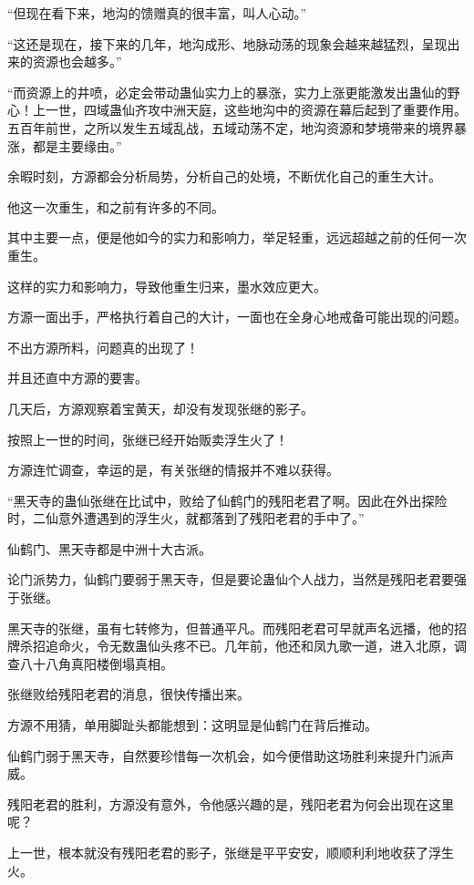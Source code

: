 \begin{this_body}
“但现在看下来，地沟的馈赠真的很丰富，叫人心动。”

“这还是现在，接下来的几年，地沟成形、地脉动荡的现象会越来越猛烈，呈现出来的资源也会越多。”

“而资源上的井喷，必定会带动蛊仙实力上的暴涨，实力上涨更能激发出蛊仙的野心！上一世，四域蛊仙齐攻中洲天庭，这些地沟中的资源在幕后起到了重要作用。五百年前世，之所以发生五域乱战，五域动荡不定，地沟资源和梦境带来的境界暴涨，都是主要缘由。”

余暇时刻，方源都会分析局势，分析自己的处境，不断优化自己的重生大计。

他这一次重生，和之前有许多的不同。

其中主要一点，便是他如今的实力和影响力，举足轻重，远远超越之前的任何一次重生。

这样的实力和影响力，导致他重生归来，墨水效应更大。

方源一面出手，严格执行着自己的大计，一面也在全身心地戒备可能出现的问题。

不出方源所料，问题真的出现了！

并且还直中方源的要害。

几天后，方源观察着宝黄天，却没有发现张继的影子。

按照上一世的时间，张继已经开始贩卖浮生火了！

方源连忙调查，幸运的是，有关张继的情报并不难以获得。

“黑天寺的蛊仙张继在比试中，败给了仙鹤门的残阳老君了啊。因此在外出探险时，二仙意外遭遇到的浮生火，就都落到了残阳老君的手中了。”

仙鹤门、黑天寺都是中洲十大古派。

论门派势力，仙鹤门要弱于黑天寺，但是要论蛊仙个人战力，当然是残阳老君要强于张继。

黑天寺的张继，虽有七转修为，但普通平凡。而残阳老君可早就声名远播，他的招牌杀招追命火，令无数蛊仙头疼不已。几年前，他还和凤九歌一道，进入北原，调查八十八角真阳楼倒塌真相。

张继败给残阳老君的消息，很快传播出来。

方源不用猜，单用脚趾头都能想到：这明显是仙鹤门在背后推动。

仙鹤门弱于黑天寺，自然要珍惜每一次机会，如今便借助这场胜利来提升门派声威。

残阳老君的胜利，方源没有意外，令他感兴趣的是，残阳老君为何会出现在这里呢？

上一世，根本就没有残阳老君的影子，张继是平平安安，顺顺利利地收获了浮生火。


\end{this_body}

